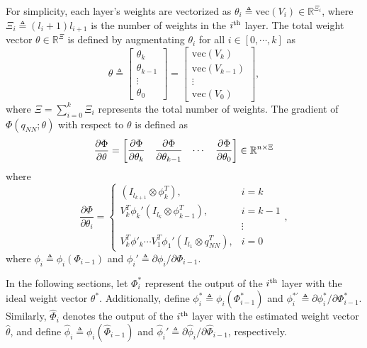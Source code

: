 \documentclass[lettersize,journal]{IEEEtran}
\begin{document}
For simplicity, each layer's weights are vectorized as $\theta_i\triangleq\text{vec}(V_i)\in\mathbb{R}^{\Xi_i}$, where $\Xi_i\triangleq (l_i+1)l_{i+1}$ is the number of weights in the $i\textsuperscript{th}$ layer. The total weight vector $\theta\in\mathbb{R}^{\Xi}$ is defined by augmentating $\theta_i$ for all $i\in \left[0,\cdots,k\right]$ as 
\begin{equation}
    \theta \triangleq 
    \begin{bmatrix}
        \theta_k\\
        \theta_{k-1}\\
        \vdots\\
        \theta_0
    \end{bmatrix}
    =
    \begin{bmatrix}
        \text{vec}(V_k)\\
        \text{vec}(V_{k-1})\\
        \vdots\\
        \text{vec}(V_0)
    \end{bmatrix},
\end{equation}
where $\Xi={\sum_{i=0}^{k} \Xi_i}$ represents the total number of weights. The gradient of $ \Phi(q_{NN};\theta)$ with respect to $\theta$ is defined as
\begin{equation}
    {\partial\Phi\over\partial \theta}=
    \begin{bmatrix}
        \dfrac{\partial \Phi}{\partial \theta_k}&
        \dfrac{\partial \Phi}{\partial \theta_{k-1}}&
    \cdots &
        \dfrac{\partial \Phi}{\partial \theta_0}
    \end{bmatrix}
    \in\mathbb{R}^{n \times \Xi}
    \label{eq. nabla phi}
\end{equation}
where
\begin{equation}
    \frac{\partial \Phi}{\partial \theta_i} = 
    \begin{cases}
        (I_{l_{k+1}}\otimes \phi_{k}^T  ), & i=k \\
        V_k^T   \phi_{k}' (I_{l_{k}}\otimes  \phi_{k-1}^T  ), & i=k-1\\
        &\vdots \\
        V_k^T   \phi'_{k} \cdots V_1^T  \phi_1' (I_{l_1}\otimes q_{NN}^T  ), & i = 0
    \end{cases},
\end{equation}
where $\phi_i\triangleq \phi_i(\Phi_{i-1})$ and $\phi_i'\triangleq \partial \phi_i/\partial \Phi_{i-1}$.

In the following sections, let $\Phi^*_i$ represent the output of the $i\textsuperscript{th}$ layer with the ideal weight vector $\theta^*$. Additionally, define $\phi^*_i\triangleq\phi_i(\Phi^*_{i-1})$ and $\phi^{*'}_i\triangleq \partial \phi^*_i/\partial \Phi^*_{i-1}$. Similarly, $\hat\Phi_i$ denotes the output of the $i\textsuperscript{th}$ layer with the estimated weight vector $\hat \theta$, and define $\hat\phi_i\triangleq\phi_i(\hat\Phi_{i-1})$ and $\hat\phi_i'\triangleq \partial \hat\phi_i/\partial \hat\Phi_{i-1}$, respectively.
\end{document}
